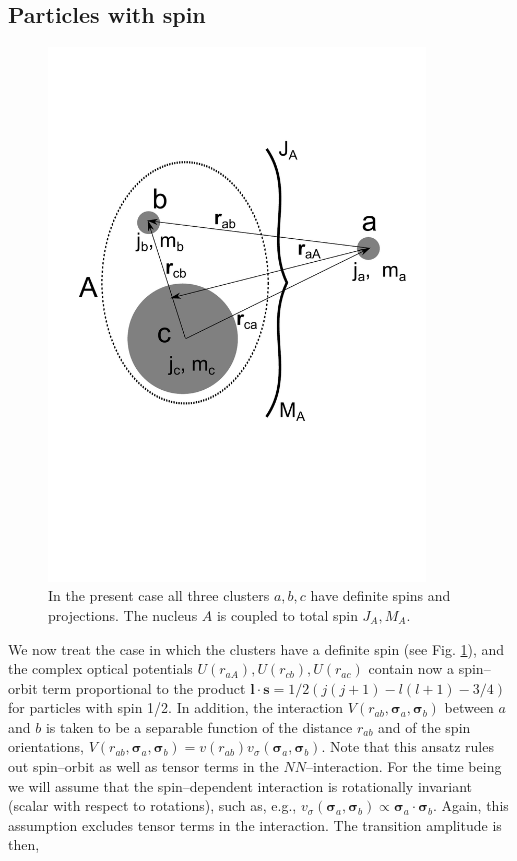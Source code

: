 \subsection{Particles with spin}
 \begin{figure}
\centerline{\includegraphics*[width=10cm,angle=0]{C6/figs_C6/knock2.pdf}}
\vspace{-4cm}
\caption{In the present case all three clusters $a,b,c$ have definite spins and projections. The nucleus $A$ is coupled to total spin $J_A,M_A$.}\label{figC6AppF3}
\end{figure}
We  now treat  the case in which the clusters have a definite spin (see Fig. \ref{figC6AppF3}),  and the complex  optical potentials $U(r_{aA}),U(r_{cb}),U(r_{ac})$ contain now  a spin--orbit term proportional to the  product $\mathbf l \cdot \mathbf s=1/2(j(j+1)-l(l+1)-3/4)$ for particles with spin 1/2. In addition, the interaction $V(r_{ab},\boldsymbol\sigma_a,\boldsymbol\sigma_b)$ between $a$ and $b$ is taken to be a separable function of the distance $r_{ab}$ and of the spin orientations, $V(r_{ab},\boldsymbol\sigma_a,\boldsymbol\sigma_b)=v(r_{ab})v_\sigma(\boldsymbol\sigma_a,\boldsymbol\sigma_b)$. Note that this ansatz rules out spin--orbit as well as tensor terms in the $NN$--interaction. For the time being we will assume that the spin--dependent interaction is rotationally invariant (scalar with respect to rotations), such as, e.g., $v_\sigma(\boldsymbol\sigma_a,\boldsymbol\sigma_b)\propto\boldsymbol\sigma_a \cdot\boldsymbol\sigma_b$. Again, this assumption excludes tensor terms in the interaction. The transition amplitude is then,
